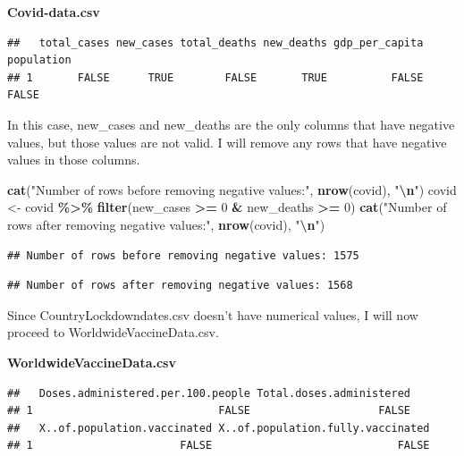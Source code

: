 \documentclass[
]{article}
\newenvironment{Shaded}{\begin{snugshade}}{\end{snugshade}}
\newcommand{\DecValTok}[1]{\textcolor[rgb]{0.00,0.00,0.81}{#1}}
\newcommand{\FunctionTok}[1]{\textcolor[rgb]{0.13,0.29,0.53}{\textbf{#1}}}
\newcommand{\NormalTok}[1]{#1}
\newcommand{\OtherTok}[1]{\textcolor[rgb]{0.56,0.35,0.01}{#1}}
\newcommand{\SpecialCharTok}[1]{\textcolor[rgb]{0.81,0.36,0.00}{\textbf{#1}}}
\newcommand{\StringTok}[1]{\textcolor[rgb]{0.31,0.60,0.02}{#1}}
\begin{document}
\textbf{Covid-data.csv}

\begin{verbatim}
##   total_cases new_cases total_deaths new_deaths gdp_per_capita population
## 1       FALSE      TRUE        FALSE       TRUE          FALSE      FALSE
\end{verbatim}

In this case, new\_cases and new\_deaths are the only columns that have
negative values, but those values are not valid. I will remove any rows
that have negative values in those columns.

\begin{Shaded}
\begin{Highlighting}[]
\FunctionTok{cat}\NormalTok{(}\StringTok{"Number of rows before removing negative values:"}\NormalTok{, }\FunctionTok{nrow}\NormalTok{(covid), }\StringTok{"}\SpecialCharTok{\textbackslash{}n}\StringTok{"}\NormalTok{)}
\NormalTok{covid }\OtherTok{\textless{}{-}}\NormalTok{ covid }\SpecialCharTok{\%\textgreater{}\%}
  \FunctionTok{filter}\NormalTok{(new\_cases }\SpecialCharTok{\textgreater{}=} \DecValTok{0} \SpecialCharTok{\&}\NormalTok{ new\_deaths }\SpecialCharTok{\textgreater{}=} \DecValTok{0}\NormalTok{)}
\FunctionTok{cat}\NormalTok{(}\StringTok{"Number of rows after removing negative values:"}\NormalTok{, }\FunctionTok{nrow}\NormalTok{(covid), }\StringTok{"}\SpecialCharTok{\textbackslash{}n}\StringTok{"}\NormalTok{)}
\end{Highlighting}
\end{Shaded}

\begin{verbatim}
## Number of rows before removing negative values: 1575
\end{verbatim}

\begin{verbatim}
## Number of rows after removing negative values: 1568
\end{verbatim}

Since CountryLockdowndates.csv doesn't have numerical values, I will now
proceed to WorldwideVaccineData.csv.\newline \vspace{1cm}

\textbf{WorldwideVaccineData.csv}

\begin{verbatim}
##   Doses.administered.per.100.people Total.doses.administered
## 1                             FALSE                    FALSE
##   X..of.population.vaccinated X..of.population.fully.vaccinated
## 1                       FALSE                             FALSE
\end{verbatim}
\end{document}
